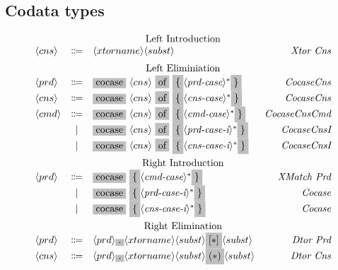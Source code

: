 \documentclass[11pt]{article}
\newcommand{\nonterminal}[1]{\langle #1 \rangle}
\newcommand{\terminal}[1]{\colorbox{lightgray}{#1}}
\begin{document}
\subsection{Codata types}
\[
  \begin{array}{lclr}
    \multicolumn{4}{c}{\text{Left Introduction}} \\
    \nonterminal{cns} & \Coloneqq & \nonterminal{xtorname}\nonterminal{subst} & \emph{Xtor Cns} \\[0.2cm]
    \multicolumn{4}{c}{\text{Left Eliminiation}} \\
    \nonterminal{prd} & \Coloneqq & \terminal{cocase}\ \nonterminal{cns}\ \terminal{of}\ \terminal{\{} \nonterminal{\textit{prd-case}}^{\ast} \terminal{\}} & \emph{CocaseCns} \\
    \nonterminal{cns} & \Coloneqq & \terminal{cocase}\ \nonterminal{cns}\ \terminal{of}\ \terminal{\{} \nonterminal{\textit{cns-case}}^{\ast} \terminal{\}} & \emph{CocaseCns} \\
    \nonterminal{cmd} & \Coloneqq & \terminal{cocase}\ \nonterminal{cns}\ \terminal{of}\ \terminal{\{} \nonterminal{\textit{cmd-case}}^{\ast} \terminal{\}} & \emph{CocaseCnsCmd} \\
    & | & \terminal{cocase}\ \nonterminal{cns}\ \terminal{of}\ \terminal{\{} \nonterminal{\textit{prd-case-i}}^{\ast} \terminal{\}} & \emph{CocaseCnsI} \\
    & | & \terminal{cocase}\ \nonterminal{cns}\ \terminal{of}\ \terminal{\{} \nonterminal{\textit{cns-case-i}}^{\ast} \terminal{\}} & \emph{CocaseCnsI} \\[0.2cm]
    \multicolumn{4}{c}{\text{Right Introduction}} \\
    \nonterminal{prd} & \Coloneqq & \terminal{cocase}\ \terminal{\{} \nonterminal{\textit{cmd-case}}^{\ast} \terminal{\}} & \emph{XMatch Prd} \\
    & | & \terminal{cocase}\ \terminal{\{} \nonterminal{\textit{prd-case-i}}^{\ast} \terminal{\}} & \emph{Cocase} \\
    & | & \terminal{cocase}\ \terminal{\{} \nonterminal{\textit{cns-case-i}}^{\ast} \terminal{\}} & \emph{Cocase} \\[0.2cm]
    \multicolumn{4}{c}{\text{Right Elimination}} \\
    \nonterminal{prd} & \Coloneqq & \nonterminal{prd}\terminal{.}\nonterminal{xtorname}\nonterminal{subst}\terminal{$[\ast]$}\nonterminal{subst} & \emph{Dtor Prd} \\
    \nonterminal{cns} & \Coloneqq & \nonterminal{prd}\terminal{.}\nonterminal{xtorname}\nonterminal{subst}\terminal{$(\ast)$}\nonterminal{subst} & \emph{Dtor Cns} \\
  \end{array}
\]
\end{document}
